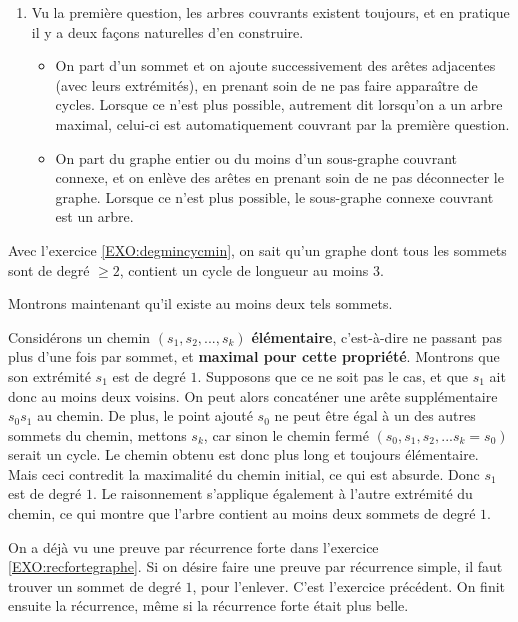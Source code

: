 \begin{Soln}{84}
\begin{enumerate}
\item Vu la première question, les arbres couvrants existent toujours, et en pratique il y a deux façons naturelles d'en construire.
\begin{itemize}
\item On part d'un sommet et on ajoute successivement des arêtes adjacentes (avec leurs extrémités), en prenant soin de ne pas faire apparaître de cycles. Lorsque ce n'est plus possible, autrement dit lorsqu'on a un arbre maximal, celui-ci est automatiquement couvrant par la première question.
\item On part du graphe entier ou du moins d'un sous-graphe couvrant connexe, et on enlève des arêtes en prenant soin de ne pas déconnecter le graphe. Lorsque ce n'est plus possible, le sous-graphe connexe couvrant est un arbre.
\end{itemize}
\end{enumerate}
\end{Soln}
\begin{Soln}{85}
Avec l'exercice \ref{EXO:degmincycmin}, on sait qu'un graphe dont tous les sommets sont de degré $\geq 2$, contient un cycle de longueur au moins $3$.

Montrons maintenant qu'il existe au moins deux tels sommets.

Considérons un chemin $(s_1, s_2, ..., s_k)$ \textbf{élémentaire}, c'est-à-dire ne passant pas plus d'une fois par sommet, et \textbf{maximal pour cette propriété}. Montrons que son extrémité $s_1$ est de degré $1$. Supposons que ce ne soit pas le cas, et que $s_1$ ait donc au moins deux voisins. On peut alors concaténer une arête supplémentaire $s_0s_1$ au chemin. De plus, le point ajouté $s_0$ ne peut être égal à un des autres sommets du chemin, mettons $s_k$, car sinon le chemin fermé $(s_0, s_1, s_2, ... s_k=s_0)$ serait un cycle. Le chemin obtenu est donc plus long et toujours élémentaire. Mais ceci contredit la maximalité du chemin initial, ce qui est absurde. Donc $s_1$ est de degré $1$. Le raisonnement s'applique également à l'autre extrémité du chemin, ce qui montre que l'arbre contient au moins deux sommets de degré $1$.

\end{Soln}
\begin{Soln}{86}
On a déjà vu une preuve par récurrence forte dans l'exercice \ref{EXO:recfortegraphe}.  Si on désire faire une preuve par récurrence simple, il faut trouver un sommet de degré $1$, pour l'enlever. C'est l'exercice précédent. On finit ensuite la récurrence, même si la récurrence forte était plus belle.
\end{Soln}
